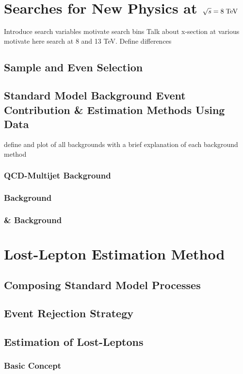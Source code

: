 \chapter{Searches for New Physics at $\sqrt{s}=8 \;\text{Te}\kern-0.06667em\text{V}$}
\label{sec:SUSY_Search_8TeV_Intro}
\todo Introduce search variables motivate search bins
\todo Talk about x-section at various \CM motivate here search at 8 and 13 TeV. Define differences
\section{Sample and Even Selection}
\section{Standard Model Background Event Contribution \& Estimation Methods Using Data}
\label{sec:SUSY_Search_8TeV_SM_BackGrounds}
\todo define and plot of all backgrounds with a brief explanation of each background method
\subsection{QCD-Multijet Background}
\subsection{\ZInv Background}
\subsection{\wpj \& \ttbar Background}


\chapter{Lost-Lepton Estimation Method}
\label{sec:Lost_Lepton_8TeV}


\section{Composing Standard Model Processes}

\section{Event Rejection Strategy}

\section{Estimation of Lost-Leptons}
\subsection{Basic Concept}
